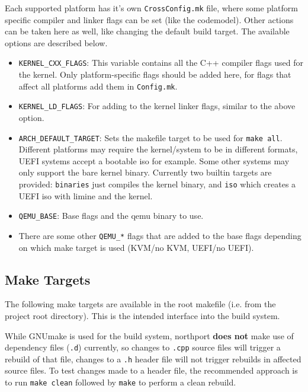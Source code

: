 Each supported platform has it's own \verb|CrossConfig.mk| file, where some platform specific compiler and linker flags can be set (like the codemodel). Other actions can be taken here as well, like changing the default build target. The available options are described below.

\begin{itemize}
    \item \verb|KERNEL_CXX_FLAGS|: This variable contains all the C++ compiler flags used for the kernel. Only platform-specific flags should be added here, for flags that affect all platforms add them in \verb|Config.mk|.
    \item \verb|KERNEL_LD_FLAGS|: For adding to the kernel linker flags, similar to the above option.
    \item \verb|ARCH_DEFAULT_TARGET|: Sets the makefile target to be used for \verb|make all|. Different platforms may require the kernel/system to be in different formats, UEFI systems accept a bootable iso for example. Some other systems may only support the bare kernel binary. Currently two builtin targets are provided: \verb|binaries| just compiles the kernel binary, and \verb|iso| which creates a UEFI iso with limine and the kernel.
    \item \verb|QEMU_BASE|: Base flags and the qemu binary to use.
    \item There are some other \verb|QEMU_*| flags that are added to the base flags depending on which make target is used (KVM/no KVM, UEFI/no UEFI).
\end{itemize}

\subsection{Make Targets}
The following make targets are available in the root makefile (i.e. from the project root directory). This is the intended interface into the build system.

While GNUmake is used for the build system, northport \textbf{does not} make use of dependency files (\verb|.d|) currently, so changes to \verb|.cpp| source files will trigger a rebuild of that file, changes to a \verb|.h| header file will not trigger rebuilds in affected source files. To test changes made to a header file, the recommended approach is to run \verb|make clean| followed by \verb|make| to perform a clean rebuild.

